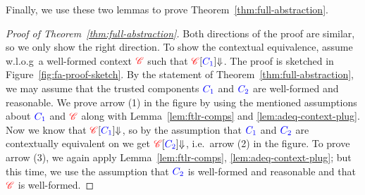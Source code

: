 Finally, we use these two lemmas to prove Theorem~\ref{thm:full-abstraction}.
\begin{proof}[Proof of Theorem~\ref{thm:full-abstraction}]
  Both directions of the proof are similar, so we only show the right direction.
  To show the \trgcm{} contextual equivalence, assume w.l.o.g\ a well-formed context $\trg{\context}$ such that ${\plug{\trg{\context}}{\src{\comp_1}} \term[]{}}$.
  The proof is sketched in Figure~\ref{fig:fa-proof-sketch}.
  By the statement of Theorem~\ref{thm:full-abstraction}, we may assume that the trusted components $\src{\comp_1}$ and $\src{\comp_2}$ are well-formed and reasonable.
  We prove arrow (1) in the figure by using the mentioned assumptions about $\src{\comp_1}$ and $\trg{\context}$ along with Lemma~\ref{lem:ftlr-comps} and \ref{lem:adeq-context-plug}.
  Now we know that ${\plug{\trg{\context}}{\src{\comp_1}} \sterm[]{}{}}$, so by the assumption that $\src{\comp_1}$ and $\src{\comp_2}$ are contextually equivalent on \srccm{} we get ${\plug{\trg{\context}}{\src{\comp_2}} \sterm[]{}{}}$, i.e.\ arrow (2) in the figure.
  To prove arrow (3), we again apply Lemma~\ref{lem:ftlr-comps}, \ref{lem:adeq-context-plug}; but this time, we use the assumption that $\src{\comp_2}$ is well-formed and reasonable and that $\trg{\context}$ is well-formed.
\end{proof}

